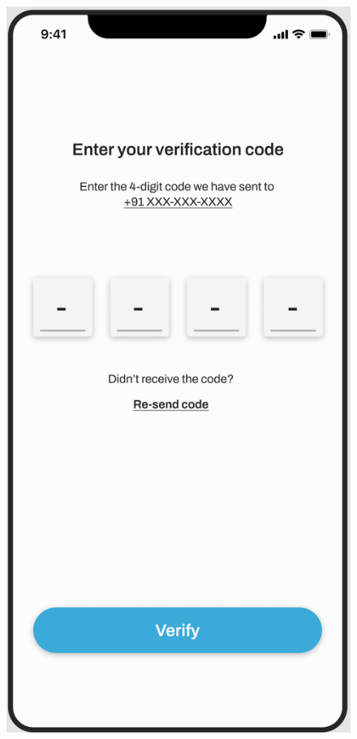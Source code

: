 \begin{figure}[h]
    \centering    
    \includegraphics[scale=0.1]{ui-images/PhoneOTP.png}
    \hspace{20pt}

\end{figure}
